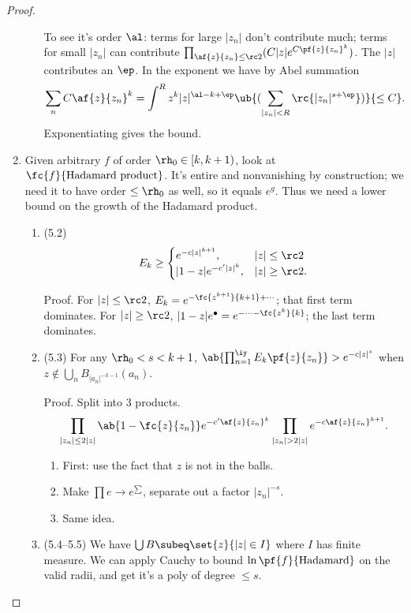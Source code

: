 \begin{proof}
\begin{enumerate}
\begin{enumerate}
To see it's order $\al$: terms for large $|z_n|$ don't contribute much; terms for small $|z_n|$ can contribute $\prod_{\af{z}{z_n}\le \rc2} (C|z| e^{C\pf{z}{z_n}^k})$. The $|z|$ contributes an $\ep$. In the exponent we have by Abel summation
\[
\sum_n C\af{z}{z_n}^k = \int^R z^k|z|^{\al-k+\ep} \ub{(\sum_{|z_n|<R} \rc{|z_n|^{s+\ep}})}{\le C}.
\]
Exponentiating gives the bound.
\end{enumerate}
\item
Given arbitrary $f$ of order $\rh_0\in [k, k+1)$, look at $\fc{f}{\text{Hadamard product}}$. It's entire and nonvanishing by construction; we need it to have order $\le \rh_0$ as well, so it equals $e^g$. Thus we need a lower bound on the growth of the Hadamard product.
\begin{enumerate}
\item 
(5.2) 
\[
E_k \ge\begin{cases}
e^{-c|z|^{k+1}},&|z|\le \rc2\\
|1-z|e^{-c'|z|^k},&|z|\ge \rc2.
\end{cases}
\]

Proof. 
For $|z|\le \rc2$, $E_k=e^{-\fc{z^{k+1}}{k+1}+\cdots}$; that first term dominates. For $|z|\ge \rc2$, $|1-z|e^{\bullet}=e^{-\cdots - \fc{z^k}{k}}$; the last term dominates. 
\item (5.3) For any $\rh_0<s<k+1$, $\ab{\prod_{n=1}^{\iy} E_k\pf{z}{z_n}}>e^{-c|z|^s}$ when $z\nin \bigcup_{n}B_{|a_n|^{-k-1}}(a_n)$. 

Proof. Split into 3 products.
\[
\prod_{|z_n|\le 2|z|}\ab{1-\fc{z}{z_n}}e^{-c'\af{z}{z_n}^k} \prod_{|z_n|>2|z|} e^{-c\af{z}{z_n}^{k+1}}.
\]
\begin{enumerate}
\item
First: use the fact that $z$ is not in the balls.
\item Make $\prod e\to e^{\sum}$, separate out a factor $|z_n|^{-s}$.
\item Same idea.
\end{enumerate}
\item (5.4--5.5) We have $\bigcup B\subeq \set{z}{|z|\in I}$ where $I$ has finite measure. We can apply Cauchy to bound $\ln \pf{f}{\text{Hadamard}}$ on the valid radii, and get it's a poly of degree $\le s$.
\end{enumerate}
\end{enumerate}

\end{proof}

%
 
%
%
